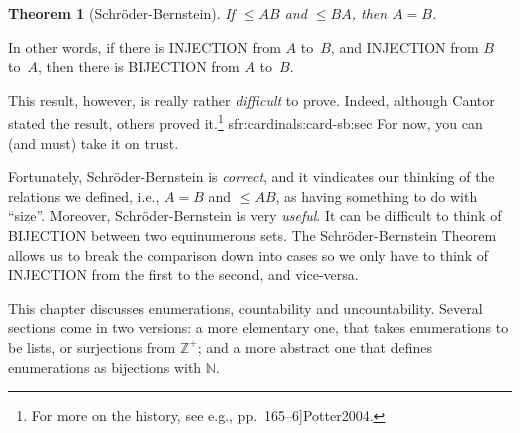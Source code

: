 \documentclass[10pt,a4paper]{article}
\makeatletter
\newcommand*{\olup}[1]{\MakeUppercase{#1}}
\theoremstyle{plain}
\newtheorem{thm}{Theorem}[section]
\theoremstyle{definition}
\theoremstyle{remark}
\newenvironment{explain}{}{}
\newenvironment{editorial}{}{}
\newcommand*{\olchapter}[3]{}
\newcommand*{\olimport}[1]{}
\newcommand*{\ollabel}[1]{\label{#1}}
\newcommand{\olref}{\@ifnextchar[{\olref@i}{\olref@final}}
\def\olref@i[#1]{\@ifnextchar[{\olref@ii}{\olref@final}}
\def\olref@ii[#1]{\@ifnextchar[{\olref@iii}{\olref@final}}
\def\olref@iii[#1]{\olref@final}
\def\olref@final#1{\ref{#1}}
\providecommand{\Nat}{\ensuremath{\mathbb{N}}}
\providecommand{\cardle}{\leq}
\providecommand{\PosInt}{\mathbb{Z}^{+}}
\providecommand{\oliflabeldef}[3]{#1}
\providecommand{\citet}[1]{\cite{#1}}
\providecommand{\cardeq}[2]{#1 = #2}
\makeatother
\begin{document}
\begin{thm}[Schr\"oder-Bernstein]
	\ollabel{thm:schroder-bernstein}
	If $\cardle{A}{B}$ and $\cardle{B}{A}$,
	then $\cardeq{A}{B}$.
\end{thm}

\begin{explain}
In other words, if there is \olup{injection} from $A$ to~$B$, and
\olup{injection} from $B$ to~$A$, then there is \olup{bijection} from $A$
to~$B$. 

This result, however, is really rather \emph{difficult} to prove.
Indeed, although Cantor stated the result, others proved
it.\footnote{For more on the history, see e.g.,
\citet[pp.~165--6]{Potter2004}.}
\oliflabeldef{sfr:cardinals:card-sb:sec}{We will only be in
a position to \emph{prove} Schr\"oder-Bernstein in
\olref[sfr][cardinals][card-sb]{sec}.}{}%
For now, you can (and must)
take it on trust. 

Fortunately, Schr\"oder-Bernstein is \emph{correct}, and it
vindicates our thinking of the relations we defined, i.e.,
$\cardeq{A}{B}$ and $\cardle{A}{B}$, as having something to do with
``size''. Moreover, Schr\"oder-Bernstein is very \emph{useful}. It
can be difficult to think of \olup{bijection} between two equinumerous
sets. The Schr\"oder-Bernstein Theorem allows us to break the comparison
down into cases so we only have to think of \olup{injection} from the
first to the second, and vice-versa.
\end{explain}



\olchapter{sfr}{siz}{The Size of Sets}

\begin{editorial}
This chapter discusses enumerations, countability and uncountability.
Several sections come in two versions: a more elementary one, that
takes enumerations to be lists, or surjections from $\PosInt$; and a
more abstract one that defines enumerations as bijections with $\Nat$.
\end{editorial}

\olimport{introduction}

\olimport{enumerability}

\olimport{zig-zag}

\olimport{pairing}

\olimport{pairing-alt}

\olimport{non-enumerability}
\end{document}
